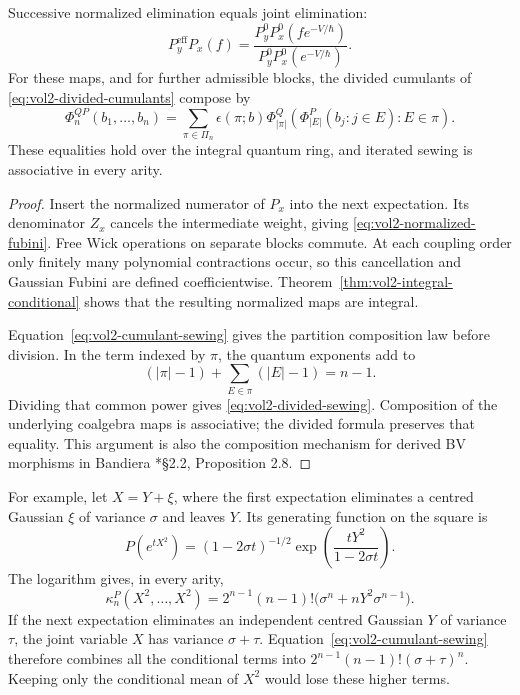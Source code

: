 \begin{theorem}\label{thm:vol2-integral-sewing}
Successive normalized elimination equals joint elimination:
\begin{equation}\label{eq:vol2-normalized-fubini}
 P_y^{\mathrm{eff}}P_x(f)
  =\frac{P_y^0P_x^0(fe^{-V/\hbar})}
         {P_y^0P_x^0(e^{-V/\hbar})}.
\end{equation}
For these maps, and for further admissible blocks, the divided
cumulants of \eqref{eq:vol2-divided-cumulants} compose by
\begin{equation}\label{eq:vol2-divided-sewing}
 \Phi_n^{QP}(b_1,\ldots,b_n)
   =\sum_{\pi\in\Pi_n}\epsilon(\pi;b)
      \Phi_{|\pi|}^Q
       \left(\Phi_{|E|}^P(b_j:j\in E):E\in\pi\right).
\end{equation}
These equalities hold over the integral quantum ring, and
iterated sewing is associative in every arity.
\end{theorem}
\begin{proof}
Insert the normalized numerator of $P_x$ into the next
expectation. Its denominator $Z_x$ cancels the intermediate
weight, giving \eqref{eq:vol2-normalized-fubini}.
Free Wick operations on separate blocks commute. At each
coupling order only finitely many polynomial contractions
occur, so this cancellation and Gaussian Fubini are defined
coefficientwise. Theorem~\ref{thm:vol2-integral-conditional}
shows that the resulting normalized maps are integral.

Equation~\eqref{eq:vol2-cumulant-sewing} gives the partition
composition law before division. In the term indexed by
$\pi$, the quantum exponents add to
\[
 (|\pi|-1)+\sum_{E\in\pi}(|E|-1)=n-1.
\]
Dividing that common power gives
\eqref{eq:vol2-divided-sewing}. Composition of the underlying
coalgebra maps is associative; the divided formula preserves
that equality. This argument is also the composition mechanism
for derived BV morphisms in Bandiera
\cite{Bandiera2020}*{\S2.2, Proposition 2.8}.
\end{proof}

For example, let $X=Y+\xi$, where the first expectation
eliminates a centred Gaussian $\xi$ of variance $\sigma$
and leaves $Y$. Its generating function on the square is
\[
 P(e^{tX^2})=(1-2\sigma t)^{-1/2}
                    \exp\!\left(\frac{tY^2}{1-2\sigma t}\right).
\]
The logarithm gives, in every arity,
\begin{equation}\label{eq:vol2-conditional-square-cumulants}
 \kappa_n^P(X^2,\ldots,X^2)
  =2^{n-1}(n-1)!
                    \bigl(\sigma^n+nY^2\sigma^{n-1}\bigr).
\end{equation}
If the next expectation eliminates an independent centred
Gaussian $Y$ of variance $\tau$, the joint variable $X$ has
variance $\sigma+\tau$. Equation~\eqref{eq:vol2-cumulant-sewing}
therefore combines all the conditional terms into
$2^{n-1}(n-1)!(\sigma+\tau)^n$.
Keeping only the conditional mean of $X^2$ would lose these
higher terms.

